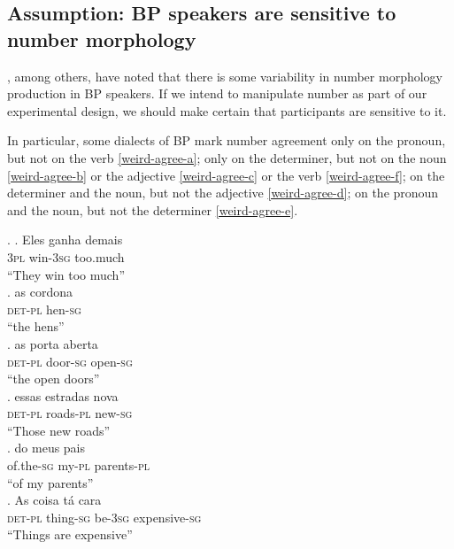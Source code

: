\documentclass[12pt,letterpaper]{article}
\begin{document}
\subsection{Assumption: BP speakers are sensitive to number morphology}

\citet{naro00}, among others, have noted that there is some variability in number morphology production in BP speakers. If we intend to manipulate number as part of our experimental design, we should make certain that participants are sensitive to it.

In particular, some dialects of BP mark number agreement only on the pronoun, but not on the verb \ref{weird-agree-a}; only on the determiner, but not on the noun \ref{weird-agree-b} or the adjective \ref{weird-agree-c} or the verb \ref{weird-agree-f}; on the determiner and the noun, but not the adjective \ref{weird-agree-d}; on the pronoun and the noun, but not the determiner \ref{weird-agree-e}.

\ex. \ag. Eles ganha demais\\ \label{weird-agree-a}
          \textsc{3pl} win-\textsc{3sg} too.much\\
          ``They win too much''\\
     \bg. as cordona\\ \label{weird-agree-b}
          \textsc{det}-\textsc{pl} hen-\textsc{sg}\\
          ``the hens''\\
     \cg. as porta aberta\\ \label{weird-agree-c}
          \textsc{det}-\textsc{pl} door-\textsc{sg} open-\textsc{sg}\\
          ``the open doors''\\
     \dg. essas estradas nova\\ \label{weird-agree-d}
         \textsc{det}-\textsc{pl} roads-\textsc{pl} new-\textsc{sg}\\
         ``Those new roads''\\
     \eg. do meus pais\\ \label{weird-agree-e}
          of.the-\textsc{sg} my-\textsc{pl} parents-\textsc{pl}\\
          ``of my parents''\\
     \fg. As coisa tá cara\\ \label{weird-agree-f}
          \textsc{det}-\textsc{pl} thing-\textsc{sg} be-\textsc{3sg} expensive-\textsc{sg}\\
          ``Things are expensive''\\
         
\end{document}
